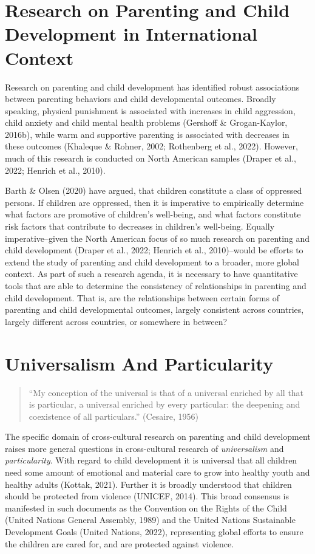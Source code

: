 \documentclass[
  letterpaper,
  DIV=11,
  numbers=noendperiod]{scrreprt}
\begin{document}
\section{Research on Parenting and Child Development in International
Context}\label{research-on-parenting-and-child-development-in-international-context}

Research on parenting and child development has identified robust
associations between parenting behaviors and child developmental
outcomes. Broadly speaking, physical punishment is associated with
increases in child aggression, child anxiety and child mental health
problems (Gershoff \& Grogan-Kaylor, 2016b), while warm and supportive
parenting is associated with decreases in these outcomes (Khaleque \&
Rohner, 2002; Rothenberg et al., 2022). However, much of this research
is conducted on North American samples (Draper et al., 2022; Henrich et
al., 2010).

Barth \& Olsen (2020) have argued, that children constitute a class of
oppressed persons. If children are oppressed, then it is imperative to
empirically determine what factors are promotive of children's
well-being, and what factors constitute risk factors that contribute to
decreases in children's well-being. Equally imperative--given the North
American focus of so much research on parenting and child development
(Draper et al., 2022; Henrich et al., 2010)--would be efforts to extend
the study of parenting and child development to a broader, more global
context. As part of such a research agenda, it is necessary to have
quantitative tools that are able to determine the consistency of
relationships in parenting and child development. That is, are the
relationships between certain forms of parenting and child developmental
outcomes, largely consistent across countries, largely different across
countries, or somewhere in between?

\section{Universalism And
Particularity}\label{universalism-and-particularity}

\begin{quote}
``My conception of the universal is that of a universal enriched by all
that is particular, a universal enriched by every particular: the
deepening and coexistence of all particulars.'' (Cesaire, 1956)
\end{quote}

The specific domain of cross-cultural research on parenting and child
development raises more general questions in cross-cultural research of
\emph{universalism} and \emph{particularity}. With regard to child
development it is universal that all children need some amount of
emotional and material care to grow into healthy youth and healthy
adults (Kottak, 2021). Further it is broadly understood that children
should be protected from violence (UNICEF, 2014). This broad consensus
is manifested in such documents as the Convention on the Rights of the
Child (United Nations General Assembly, 1989) and the United Nations
Sustainable Development Goals (United Nations, 2022), representing
global efforts to ensure the children are cared for, and are protected
against violence.
\end{document}
